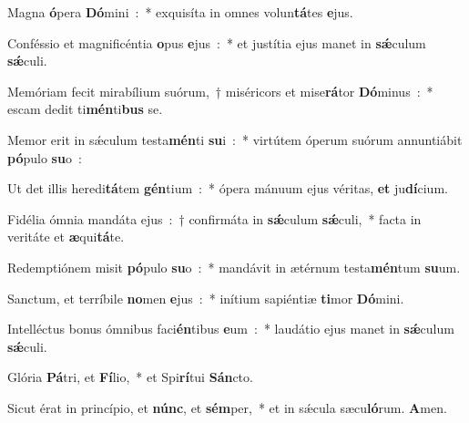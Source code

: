 ﻿\item Magna \textbf{ó}\-pera \textbf{Dó}\-mini~:~* exquisíta in omnes vo\-lun\-\textbf{tá}\-tes \textbf{e}jus.
\item Conféssio et magnificéntia \textbf{o}\-pus \textbf{e}jus~:~* et justítia ejus manet in \textbf{sǽ}\-culum \textbf{sǽ}culi.
\item Memóriam fecit mirabílium suórum,~† miséricors et mise\textbf{rá}\-tor \textbf{Dó}\-minus~:~* escam dedit ti\textbf{mén}\-ti\textbf{bus} se.
\item Memor erit in sǽculum testa\textbf{mén}\-ti \textbf{su}\-i~:~* virtútem óperum suórum annuntiábit \textbf{pó}\-pulo \textbf{su}o~:
\item Ut det illis heredi\textbf{tá}\-tem \textbf{gén}\-tium~:~* ópera mánuum ejus véritas, \textbf{et} ju\textbf{dí}cium.
\item Fidélia ómnia mandáta ejus~:~† confirmáta in \textbf{sǽ}\-cu\-lum \textbf{sǽ}\-culi,~* facta in veritáte et \textbf{æ}qui\textbf{tá}te.
\item Redemptiónem misit \textbf{pó}\-pulo \textbf{su}\-o~:~* mandávit in ætérnum testa\textbf{mén}\-tum \textbf{su}um.
\item Sanctum, et terríbile \textbf{no}\-men \textbf{e}jus~:~* inítium sapiéntiæ \textbf{ti}\-mor \textbf{Dó}mini.
\item Intelléctus bonus ómnibus faci\textbf{én}\-tibus \textbf{e}\-um~:~* laudátio ejus manet in \textbf{sǽ}\-culum \textbf{sǽ}culi.
\item Glória \textbf{Pá}\-tri, et \textbf{Fí}\-lio,~* et Spi\textbf{rí}\-tui \textbf{Sán}cto.
\item Sicut érat in princípio, et \textbf{núnc}, et \textbf{sém}\-per,~* et in sǽcula sæcu\textbf{ló}\-rum. \textbf{A}men.
